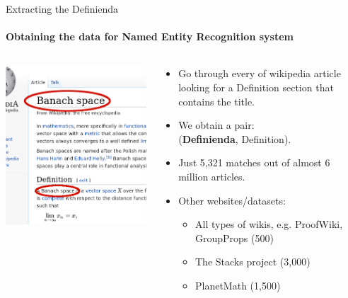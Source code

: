 \documentclass[10pt]{beamer}
\begin{document}
\begin{frame}{Extracting the Definienda}
    \framesubtitle{Obtaining the data for Named Entity Recognition system}
    \begin{columns}[T]
        \begin{column}{0.5\textwidth}
    \includegraphics[width=\textwidth]{wiki_thin_banach.png}
        \end{column}
        \begin{column}{0.5\textwidth}
            \begin{itemize}
            \item Go through every of wikipedia article looking for a Definition section that contains the title.
            \item We obtain a pair:\\
                (\textbf{Definienda},  Definition).
            \item Just 5,321 matches out of almost 6 million articles.
            \item Other websites/datasets:
                \begin{itemize}
                    \item All types of wikis, e.g. ProofWiki, GroupProps (500)
                    \item The Stacks project (3,000)
                    \item PlanetMath (1,500)
                \end{itemize}
            \end{itemize}
        \end{column}
    \end{columns}
\end{frame}
\end{document}
